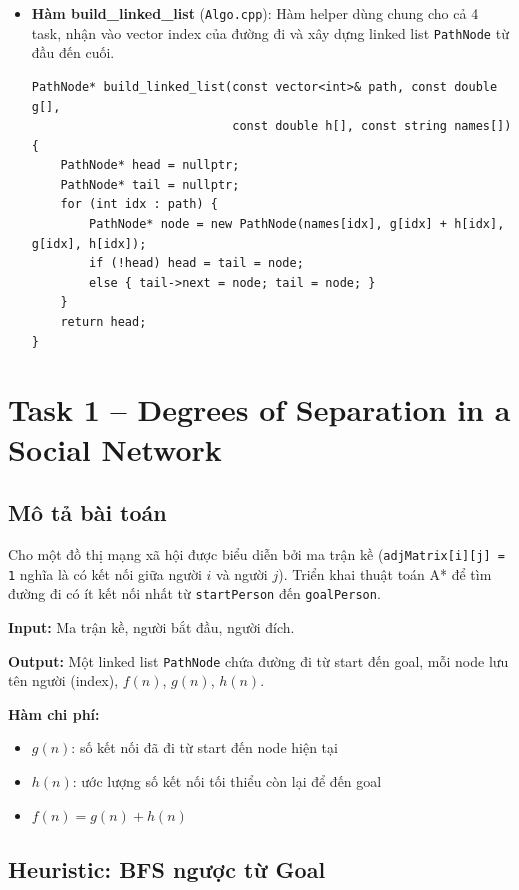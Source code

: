 \documentclass[13pt,a4paper]{article}
\begin{document}
\begin{itemize}
\begin{lstlisting}
    }
};
\end{lstlisting}
    \item \textbf{Hàm build\_linked\_list} (\texttt{Algo.cpp}): Hàm helper dùng chung cho cả 4 task, nhận vào vector index của đường đi và xây dựng linked list \texttt{PathNode} từ đầu đến cuối.
\begin{lstlisting}
PathNode* build_linked_list(const vector<int>& path, const double g[], 
                            const double h[], const string names[]) {
    PathNode* head = nullptr;
    PathNode* tail = nullptr;
    for (int idx : path) {
        PathNode* node = new PathNode(names[idx], g[idx] + h[idx], g[idx], h[idx]);
        if (!head) head = tail = node;
        else { tail->next = node; tail = node; }
    }
    return head;
}
\end{lstlisting}
\end{itemize}
\newpage

\section{Task 1 -- Degrees of Separation in a Social Network}

\subsection{Mô tả bài toán}

Cho một đồ thị mạng xã hội được biểu diễn bởi ma trận kề (\texttt{adjMatrix[i][j] = 1} nghĩa là có kết nối giữa người $i$ và người $j$). Triển khai thuật toán A* để tìm đường đi có ít kết nối nhất từ \texttt{startPerson} đến \texttt{goalPerson}.

\textbf{Input:} Ma trận kề, người bắt đầu, người đích.

\textbf{Output:} Một linked list \texttt{PathNode} chứa đường đi từ start đến goal, mỗi node lưu tên người (index), $f(n)$, $g(n)$, $h(n)$.

\textbf{Hàm chi phí:}
\begin{itemize}
    \item $g(n)$: số kết nối đã đi từ start đến node hiện tại
    \item $h(n)$: ước lượng số kết nối tối thiểu còn lại để đến goal
    \item $f(n) = g(n) + h(n)$
\end{itemize}

\subsection{Heuristic: BFS ngược từ Goal}
\end{document}
